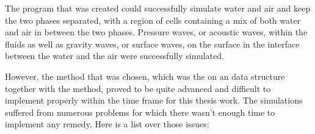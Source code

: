 
The program that was created could successfully simulate water and air and keep the two phases separated, with a region of cells containing a mix of both water and air in between the two phases. Pressure waves, or acoustic waves, within the fluids as well as gravity waves, or surface waves, on the surface in the interface between the water and the air were successfully simulated.


However, the method that was chosen, which was the \FVM on an \octree data structure together with the \VOF method, proved to be quite advanced and difficult to implement properly within the time frame for this thesis work. The simulations suffered from numerous problems for which there wasn't enough time to implement any remedy. Here is a list over those issues:


